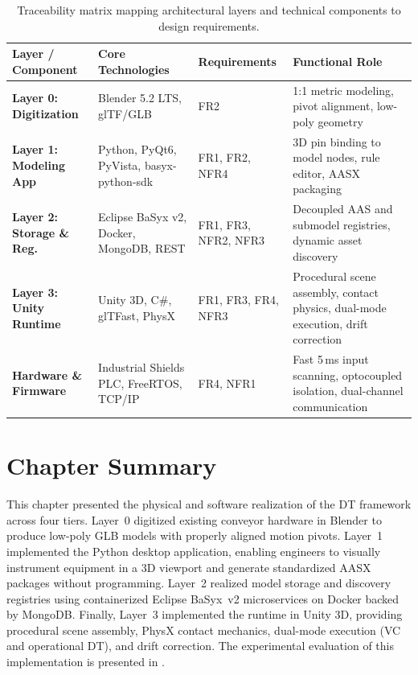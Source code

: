 \begin{landscape}
\vspace*{\fill}
\begin{table}[htbp]
    \centering
    \caption{Traceability matrix mapping architectural layers and technical components to design requirements.}
    \label{tab:impl_traceability_matrix}
    \small
    \renewcommand{\arraystretch}{1.4}
    \setlength{\tabcolsep}{8pt}
    \begin{tabularx}{\linewidth}{@{}p{4.0cm} p{5.5cm} p{2.8cm} X@{}}
        \toprule
        \textbf{Layer / Component} & \textbf{Core Technologies} & \textbf{Requirements} & \textbf{Functional Role} \\ \midrule
        \textbf{Layer 0: Digitization} & Blender 5.2 LTS, \gls{glTF}/\gls{GLB} & FR2 & 1:1 metric modeling, pivot alignment, low-poly geometry \\ \addlinespace[4pt]
        \textbf{Layer 1: Modeling App} & Python, PyQt6, PyVista, basyx-python-sdk & FR1, FR2, NFR4 & 3D pin binding to model nodes, rule editor, \gls{AASX} packaging \\ \addlinespace[4pt]
        \textbf{Layer 2: Storage \& Reg.} & Eclipse BaSyx v2, Docker, MongoDB, \gls{REST} & FR1, FR3, NFR2, NFR3 & Decoupled \gls{AAS} and submodel registries, dynamic asset discovery \\ \addlinespace[4pt]
        \textbf{Layer 3: Unity Runtime} & Unity 3D, C\#, glTFast, PhysX & FR1, FR3, FR4, NFR3 & Procedural scene assembly, contact physics, dual-mode execution, drift correction \\ \addlinespace[4pt]
        \textbf{Hardware \& Firmware} & Industrial Shields \gls{PLC}, FreeRTOS, \gls{TCP}/\gls{IP} & FR4, NFR1 & Fast 5\,ms input scanning, optocoupled isolation, dual-channel communication \\ \bottomrule
    \end{tabularx}
\end{table}
\vspace*{\fill}
\end{landscape}

\section{Chapter Summary}
\label{sec:impl_summary}

This chapter presented the physical and software realization of the \gls{DT} framework across four tiers. Layer~0 digitized existing conveyor hardware in Blender to produce low-poly \gls{GLB} models with properly aligned motion pivots. Layer~1 implemented the Python desktop application, enabling engineers to visually instrument equipment in a 3D viewport and generate standardized \gls{AASX} packages without programming. Layer~2 realized model storage and discovery registries using containerized Eclipse BaSyx~v2 microservices on Docker backed by MongoDB. Finally, Layer~3 implemented the runtime in Unity 3D, providing procedural scene assembly, PhysX contact mechanics, dual-mode execution (\gls{VC} and operational \gls{DT}), and drift correction. The experimental evaluation of this implementation is presented in .


